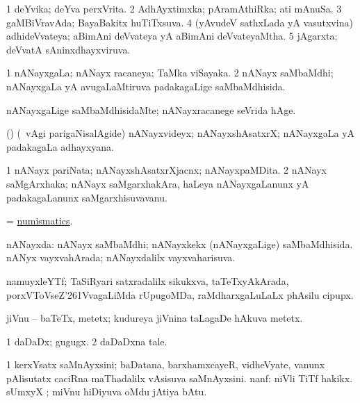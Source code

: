 \bentry
{}
\gl{\gu}
\bmng
\bnum
\num{1} deYvika; deYva perxVrita. 
\num{2} AdhAyxtimxka; pAramAthiRka; ati mAnuSa. 
\num{3} gaMBiVravAda; BayaBakitx huTiTxsuva. 
\num{4} (yAvudeV sathxLada yA vasutxvina) adhideVvateya; aBimAni deVvateya yA aBimAni deVvateyaMtha. 
\num{5} jAgarxta; deVvatA sAninxdhayxviruva. 
\enum
\emng
\eentry

\bentry
{}
\gl{\gu}
\bmng
\bnum
\num{1} nANayxgaLa; nANayx racaneya; TaMka viSayaka. 
\num{2} nANayx saMbaMdhi; nANayxgaLa yA avugaLaMtiruva padakagaLige saMbaMdhisida. 
\enum
\emng
\eentry

\bentry
{}
\gl{\kirxvi}
\bmng
nANayxgaLige saMbaMdhisidaMte; nANayxracanege seVrida hAge. 
\emng
\eentry

\bentry
{}
\gl{\nA}
\bmng
(\bava) (\sA\ \Eva vAgi parigaNisalAgide) nANayxvideyx; nANayxshAsatxrX; nANayxgaLa yA padakagaLa adhayxyana. 
\emng
\eentry

\bentry
{}
\gl{\nA}
\bmng
\bnum
\num{1} nANayx pariNata; nANayxshAsatxrXjacnx; nANayxpaMDita. 
\num{2} nANayx saMgArxhaka; nANayx saMgarxhakAra, haLeya nANayxgaLanunx yA padakagaLanunx saMgarxhisuvavanu. 
\enum
\emng
\eentry

\bentry
{}
\gl{\nA}
\bmng
= \hyperlink{numismatics}{numismatics}. 
\emng
\eentry

\bentry
{}
\gl{\gu}
\bmng
nANayxda: 
\banum
{} nANayx saMbaMdhi; nANayxkekx (nANayxgaLige) saMbaMdhisida. 
 nANyx vayxvahArada; nANayxdalilx vayxvaharisuva. 
\eanum
\emng
\eentry

\bentry
{}
\gl{\nA}
\bmng
namuyxleYTf; TaSiRyari satxradalilx sikukxva, taTeTxyAkArada, porxVToVseZ\char'261VvagaLiMda rUpugoMDa, raMdharxgaLuLaLx phAsilu cipupx. 
\emng
\eentry

\bentry
{}
\gl{\nA}
\bmng
jiVnu -- baTeTx, metetx; kudureya jiVnina taLagaDe hAkuva metetx. 
\emng
\eentry

\bentry
{}
\gl{\nA}
\bmng
\bnum
\num{1} daDaDx; gugugx. 
\num{2} daDaDxna tale. 
\enum
\emng
\eentry

\bentry
{}
\gl{\nA}
\bmng
\bnum
\num{1} kerxYsatx saMnAyxsini; baDatana, barxhamxcayeR, vidheVyate, \mo vanunx pAlisutatx caciRna maThadalilx vAsisuva saMnAyxsini. 
 nanf: 
\banum
{} niVli TiTf hakikx. 
 sUmxyX ; miVnu hiDiyuva oMdu jAtiya bAtu. 
\eanum
\numie
\enum
\emng

